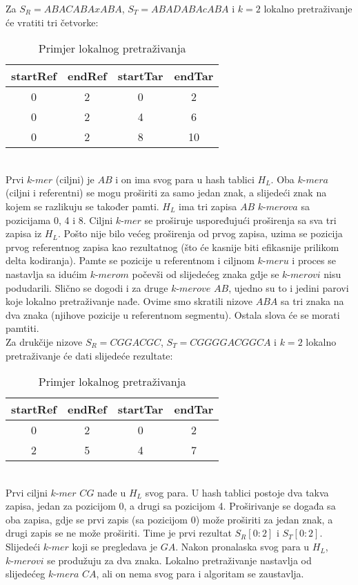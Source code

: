 \documentclass[times, utf8, diplomski]{fer}
\begin{document}
Za $\textit{S}_R = ABACABAxABA$, $\textit{S}_T = ABADABAcABA$ i $k = 2$ lokalno pretraživanje će vratiti tri četvorke:\\
\begin{table} [!h]
\centering
\begin{tabular}{|c | c | c | c|}
\hline
startRef & endRef & startTar & endTar \\
\hline
0 & 2 & 0 & 2\\
\hline
0 & 2 & 4 & 6\\
\hline 
0 & 2 & 8 & 10 \\
\hline
\end{tabular}
\caption{Primjer lokalnog pretraživanja}
\end{table}\\
Prvi $\textit{k-mer}$ (ciljni) je $AB$ i on ima svog para u hash tablici $\textit{H}_L$. Oba $\textit{k-mera}$ (ciljni i referentni) se mogu proširiti za samo jedan znak, a slijedeći znak na kojem se razlikuju se također pamti. $\textit{H}_L$ ima tri zapisa $AB$ $\textit{k-merova}$ sa pozicijama 0, 4 i 8. Ciljni $\textit{k-mer}$ se proširuje uspoređujući proširenja sa sva tri zapisa iz $\textit{H}_L$.      Pošto nije bilo većeg proširenja od prvog zapisa, uzima se pozicija prvog referentnog zapisa kao rezultatnog (što će kasnije biti efikasnije prilikom delta kodiranja). Pamte se pozicije u referentnom i ciljnom $\textit{k-meru}$ i proces se nastavlja sa idućim $\textit{k-merom}$ počevši od slijedećeg znaka gdje se $\textit{k-merovi}$ nisu podudarili. Slično se dogodi i za druge $\textit{k-merove}$ $AB$, ujedno su to i jedini parovi koje lokalno pretraživanje nađe. Ovime smo skratili nizove $ABA$ sa tri znaka na dva znaka (njihove pozicije u referentnom segmentu). Ostala slova će se morati pamtiti.\\  Za drukčije nizove $\textit{S}_R = CGGACGC$, $\textit{S}_T = CGGGGACGGCA$ i $k = 2$ lokalno pretraživanje će dati slijedeće rezultate:\\
\begin{table} [!h]
\centering
\begin{tabular}{|c | c | c | c|}
\hline
startRef & endRef & startTar & endTar \\
\hline
0 & 2 & 0 & 2\\
\hline
2 & 5 & 4 & 7\\
\hline 
\end{tabular}
\caption{Primjer lokalnog pretraživanja}
\end{table}\\
Prvi ciljni $\textit{k-mer}$ $CG$ nađe u $\textit{H}_L$ svog para. U hash tablici postoje dva takva zapisa, jedan za pozicijom 0, a drugi sa pozicijom 4. Proširivanje se događa sa oba zapisa, gdje se prvi zapis (sa pozicijom 0) može proširiti za jedan znak, a drugi zapis se ne može proširiti. Time je prvi rezultat $\textit{S}_R[0:2]$ i $\textit{S}_T[0:2]$. Slijedeći $\textit{k-mer}$ koji se pregledava je $GA$. Nakon pronalaska svog para u $\textit{H}_L$, $\textit{k-merovi}$ se produžuju za dva znaka. Lokalno pretraživanje nastavlja od slijedećeg $\textit{k-mera}$ $CA$, ali on nema svog para i algoritam se zaustavlja.\\
\end{document}
